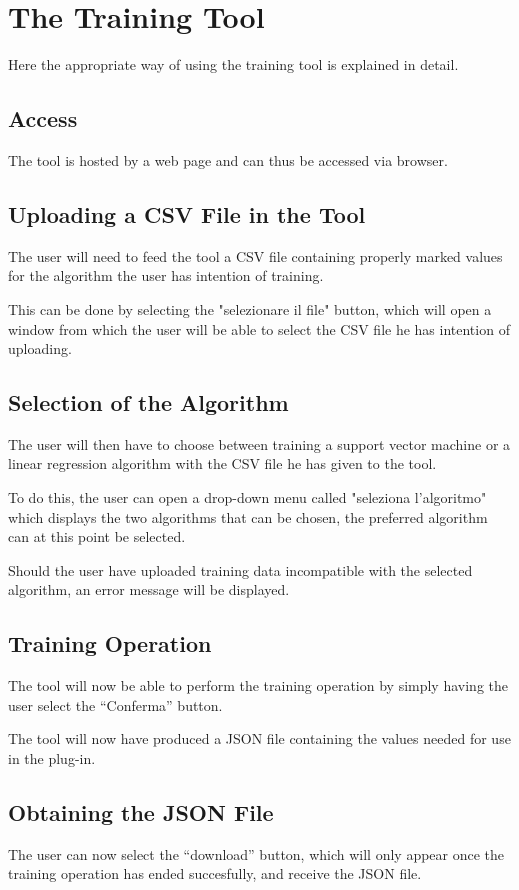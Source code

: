 \section{The Training Tool}
Here the appropriate way of using the training tool is explained in detail.

\subsection{Access}
The tool is hosted by a web page and can thus be accessed via browser.

\subsection{Uploading a CSV File in the Tool}
The user will need to feed the tool a CSV file containing properly marked values for the algorithm the user has intention of training.

This can be done by selecting the "selezionare il file" button, which will open a window from which the user will be able to select the CSV file he has intention of uploading.

\subsection{Selection of the Algorithm}
The user will then have to choose between training a support vector machine or a linear regression algorithm with the CSV file he has given to the tool.

To do this, the user can open a drop-down menu called "seleziona l'algoritmo" which displays the two algorithms that can be chosen, the preferred algorithm can at this point be selected.

Should the user have uploaded training data incompatible with the selected algorithm, an error message will be displayed.

\subsection{Training Operation}
The tool will now be able to perform the training operation by simply  having the user select the “Conferma” button.

The tool will now have produced a JSON file containing the values needed for use in the plug-in.


\subsection{Obtaining the JSON File}
The user can now select the “download” button, which will only appear once the training operation has ended succesfully, and receive the JSON file.
